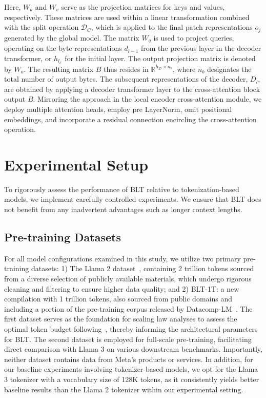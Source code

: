 Here, $W_k$ and $W_v$ serve as the projection matrices for keys and values, respectively. These matrices are used within a linear transformation combined with the split operation $\mathcal{D}_C$, which is applied to the final patch representations $o_j$ generated by the global model. The matrix $W_q$ is used to project queries, operating on the byte representations $d_{l-1}$ from the previous layer in the decoder transformer, or $h_{l_{\mathcal{E}}}$ for the initial layer. The output projection matrix is denoted by $W_o$. The resulting matrix $B$ thus resides in $\mathbb{R}^{h_{\mathcal{D}} \times n_b}$, where $n_b$ designates the total number of output bytes. The subsequent representations of the decoder, $D_l$, are obtained by applying a decoder transformer layer to the cross-attention block output $B$. Mirroring the approach in the local encoder cross-attention module, we deploy multiple attention heads, employ pre LayerNorm, omit positional embeddings, and incorporate a residual connection encircling the cross-attention operation.

\section{Experimental Setup}
\label{section:experiments}
To rigorously assess the performance of {\textsc BLT} relative to tokenization-based models, we implement carefully controlled experiments. We ensure that {\textsc BLT} does not benefit from any inadvertent advantages such as longer context lengths.

\subsection{Pre-training Datasets} For all model configurations examined in this study, we utilize two primary pre-training datasets: 1) The Llama 2 dataset~\citep{touvron2023llama}, containing 2 trillion tokens sourced from a diverse selection of publicly available materials, which undergo rigorous cleaning and filtering to ensure higher data quality; and 2) {\textsc BLT}-1T: a new compilation with 1 trillion tokens, also sourced from public domains and including a portion of the pre-training corpus released by Datacomp-LM~\citep{li2024datacomp}. The first dataset serves as the foundation for scaling law analyses to assess the optimal token budget following~\cite{dubey2024llama}, thereby informing the architectural parameters for {\textsc BLT}. The second dataset is employed for full-scale pre-training, facilitating direct comparison with Llama 3 on various downstream benchmarks. Importantly, neither dataset contains data from Meta's products or services. In addition, for our baseline experiments involving tokenizer-based models, we opt for the Llama 3 tokenizer with a vocabulary size of 128K tokens, as it consistently yields better baseline results than the Llama 2 tokenizer within our experimental setting.

